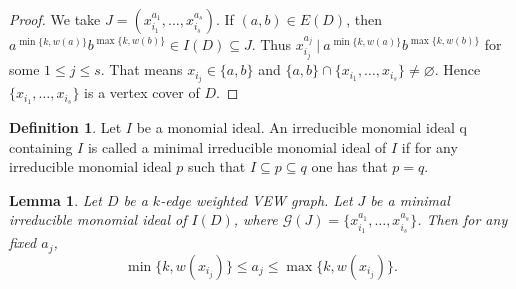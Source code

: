 \documentclass[11pt,reqno]{amsart}
\let\emptyset\varnothing
\newtheorem{lemma}[theorem]{Lemma}
\theoremstyle{definition}
\newtheorem{definition}[theorem]{Definition}
\begin{document}
\begin{proof}
We take $ J = (x_{i_1}^{a_1},\ldots,x_{i_s}^{a_s}) $. If $ (a, b) \in E(D) $, then $a^{\min\{k,w(a)\}} b^{\max\{k,w(b)\}} \in I(D) \subseteq  J   $. Thus
$x^{a_j}_
{i_j}  ~|~  a^{\min\{k,w(a)\}} b^{\max\{k,w(b)\}}   $ for some $ 1 \leq j \leq s $. That means $x_
{i_j} \in \{a, b\}  $ and $ \{a, b\} \cap  \{  x_{i_1},\ldots,x_{i_s}\} \neq  \emptyset$.
Hence $ \{  x_{i_1},\ldots,x_{i_s}\} $ is a vertex cover of $ D $.  
\end{proof}


\begin{definition}
Let $ I $ be a monomial ideal. An irreducible monomial ideal q containing
$ I $ is called a minimal irreducible monomial ideal of $ I $ if for any irreducible monomial ideal
$ p $ such that $ I \subseteq p \subseteq q $ one has that $ p = q $.
\end{definition}

\begin{lemma}\label{minmax}
	Let $ D $ be a $k$-edge weighted VEW graph. Let $ J $ be a minimal irreducible monomial ideal of $I(D)$, where $\mathcal{G}(J) = \{x^{a_1}_
	{i_1} ,\ldots, x^{a_s}_
	{i_s}\}$. Then for any fixed $a_j$,  
    $$ {\min\{k,  w(x_{i_j}) \}} \leq  a_j \leq       {\max\{k, w(x_{i_j})\}}.$$        	
\end{lemma}
\end{document}
